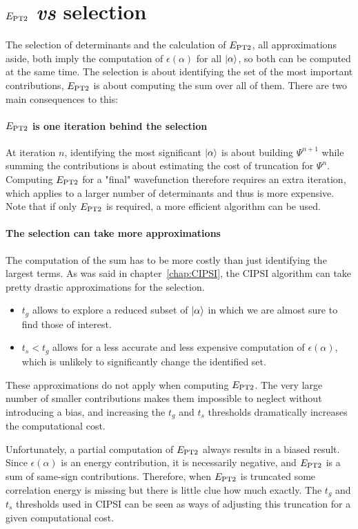 \documentclass[./thesis.tex]{subfiles}
\begin{document}
\section{$E_\text{PT2}$ \textit{vs} selection}

The selection of determinants and the calculation of $E_\text{PT2}$, all approximations aside, both imply the computation of $\epsilon(\alpha)$ for all $\ket \alpha$, so both can be computed at the same time. The selection is about identifying the set of the most important contributions, $E_\text{PT2}$ is about computing the sum over all of them. There are two main consequences to this:
\paragraph{$E_\text{PT2}$ is one iteration behind the selection}
At iteration $n$, identifying the most significant $\ket \alpha$ is about building $\Psi^{n+1}$ while summing the contributions is about estimating the cost of truncation for $\Psi^{n}$. Computing $E_\text{PT2}$ for a "final" wavefunction therefore requires an extra iteration, which applies to a larger number of determinants and thus is more expensive. Note that if only $E_\text{PT2}$ is required, a more efficient algorithm can be used.\cite{Cimiraglia_1996}

\paragraph{The selection can take more approximations}
The computation of the sum has to be more costly than just identifying the largest terms. As was said in chapter~\ref{chap:CIPSI}, the CIPSI algorithm can take pretty drastic approximations for the selection.\cite{Evangelisti_1983}
	\begin{itemize}
		\item{$t_g$}
		allows to explore a reduced subset of $\ket \alpha$ in which we are almost sure to find those of interest.
		\item{$t_s < t_g$}
		allows for a less accurate and less expensive computation of $\epsilon(\alpha)$, which is unlikely to significantly change the identified set.
	\end{itemize}
	These approximations do not apply when computing $E_\text{PT2}$. The very large number of smaller contributions makes them impossible to neglect without introducing a bias, and increasing the $t_g$ and $t_s$ thresholds dramatically increases the computational cost.


Unfortunately, a partial computation of $E_\text{PT2}$ always results in a biased result. Since $\epsilon(\alpha)$ is an energy contribution, it is necessarily negative, and $E_\text{PT2}$ is a sum of same-sign contributions. Therefore, when $E_\text{PT2}$ is truncated some correlation energy is missing but there is little clue how much exactly. The $t_g$ and $t_s$ thresholds used in CIPSI can be seen as ways of adjusting this truncation for a given computational cost.
\end{document}
